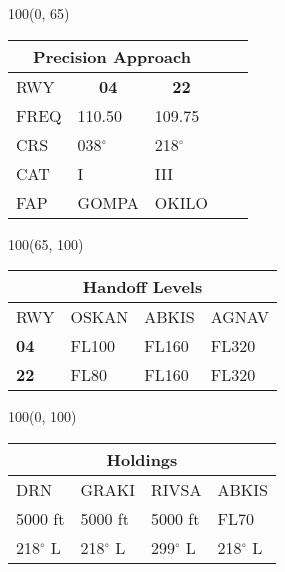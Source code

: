 \documentclass[10pt,landscape,a4paper]{article}
\begin{document}
\begin{textblock}{100}(0, 65)
\begin{table}[]
\begin{tabular}{lllll}
\multicolumn{3}{c}{\textbf{Precision Approach}} \\ \hline
\multicolumn{1}{|l|}{RWY} & \multicolumn{1}{c|}{\textbf{04}} & \multicolumn{1}{c|}{\textbf{22}}\\ \hline
\multicolumn{1}{|l|}{FREQ} & \multicolumn{1}{l|}{110.50} & \multicolumn{1}{l|}{109.75}\\
\multicolumn{1}{|l|}{CRS} & \multicolumn{1}{l|}{038$^\circ$} & \multicolumn{1}{l|}{218$^\circ$}\\
\multicolumn{1}{|l|}{CAT} & \multicolumn{1}{l|}{I} & \multicolumn{1}{l|}{III}\\
\multicolumn{1}{|l|}{FAP} & \multicolumn{1}{l|}{GOMPA} & \multicolumn{1}{l|}{OKILO} \\ \hline
\end{tabular}
\end{table}
\end{textblock}

\begin{textblock}{100}(65, 100)
\begin{table}[]
\begin{tabular}{|l|l|l|l|}
\multicolumn{4}{c}{\textbf{Handoff Levels}} \\ \hline
RWY & OSKAN & ABKIS & AGNAV \\ \hline
\textbf{04} & FL100 & FL160 & FL320\\
\textbf{22} & FL80 & FL160 & FL320\\ \hline
\end{tabular}
\end{table}
\end{textblock}

\begin{textblock}{100}(0, 100)
\begin{table}[]
\begin{tabular}{|l|l|l|l|}
\multicolumn{4}{c}{\textbf{Holdings}} \\ \hline
DRN & GRAKI & RIVSA & ABKIS \\ \hline
5000 ft & 5000 ft & 5000 ft & FL70  \\
218$^\circ$ L & 218$^\circ$ L & 299$^\circ$ L & 218$^\circ$ L \\ \hline
\end{tabular}
\end{table}
\end{textblock}
\end{document}
